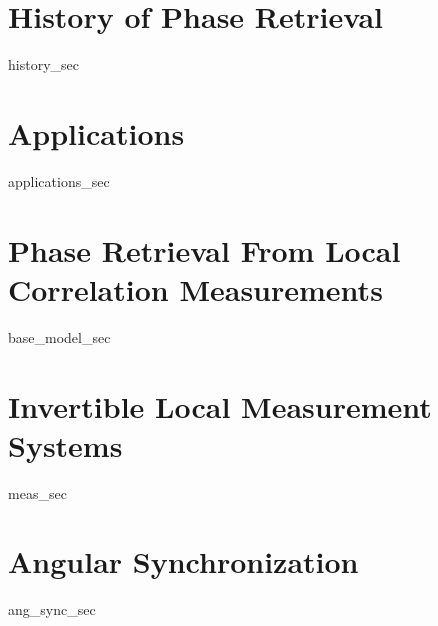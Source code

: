 \documentclass[12pt]{ucsd-thesis}
\begin{document}
\begin{frontmatter}
\begin{vitapage}
\end{vitapage}

\begin{abstract}

\end{abstract}

\end{frontmatter}

\chapter{History of Phase Retrieval}
{history_sec}

\chapter{Applications}
{applications_sec}

\chapter{Phase Retrieval From Local Correlation Measurements}
\label{ch:our_model}
\label{ch:base_model}
{base_model_sec}

\chapter{Invertible Local Measurement Systems}
{meas_sec}

\chapter{Angular Synchronization}
{ang_sync_sec}
\end{document}
